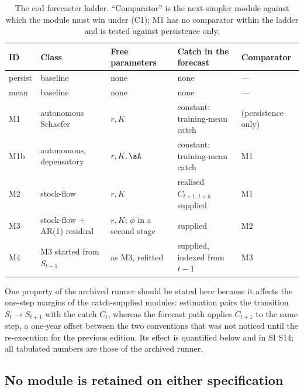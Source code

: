 \begin{table}[!htb]
\centering\small
\caption{The cod forecaster ladder. ``Comparator'' is the next-simpler module against which the module must win under (C1); M1 has no comparator within the ladder and is tested against persistence only.}
\label{tab:ladder}
\begin{tabularx}{\textwidth}{@{}l>{\raggedright\arraybackslash}p{}>{\raggedright\arraybackslash}p{}LL@{}}
\toprule
ID & Class & Free parameters & Catch in the forecast & Comparator \\
\midrule
persist & baseline & none & none & --- \\
mean & baseline & none & none & --- \\
M1 & autonomous Schaefer & $r,K$ & constant: training-mean catch & (persistence only) \\
M1b & autonomous, depensatory & $r,K,\sA$ & constant: training-mean catch & M1 \\
M2 & stock-flow & $r,K$ & realised $C_{t+1..t+h}$ supplied & M1 \\
M3 & stock-flow $+$ AR(1) residual & $r,K$; $\phi$ in a second stage & supplied & M2 \\
M4 & M3 started from $S_{t-1}$ & as M3, refitted & supplied, indexed from $t-1$ & M3 \\
\bottomrule
\end{tabularx}
\end{table}

One property of the archived runner should be stated here because it affects the one-step margins of the catch-supplied modules: estimation pairs the transition $S_t\to S_{t+1}$ with the catch $C_t$, whereas the forecast path applies $C_{t+1}$ to the same step, a one-year offset between the two conventions that was not noticed until the re-execution for the previous edition. Its effect is quantified below and in SI S14; all tabulated numbers are those of the archived runner.

\FloatBarrier
\subsection{No module is retained on either specification}\label{sec:pooled}

